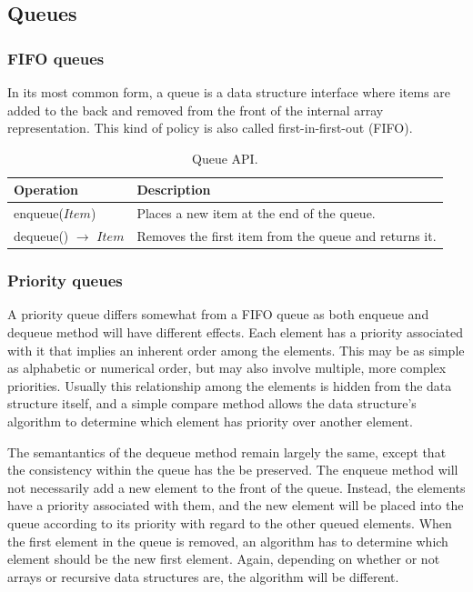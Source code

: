 \subsection{Queues}

\subsubsection{FIFO queues}

In its most common form, a queue is a data structure interface where items are added to the back and removed from the front of the internal array representation. This kind of policy is also called first-in-first-out (FIFO).

\begin{table}[H]
	\caption{Queue API.}
	\label{tab:api:queue}
	\begin{tabular}{p{150px} | p{250px}}
		\textbf{Operation} & \textbf{Description} \\
		\hline
		enqueue($Item$) & Places a new item at the end of the queue. \\
		dequeue() $\rightarrow$ $Item$ & Removes the first item from the queue and returns it. \\
		\hline
	\end{tabular}
\end{table}



\subsubsection{Priority queues}

A priority queue differs somewhat from a FIFO queue as both enqueue and dequeue method will have different effects. Each element has a priority associated with it that implies an inherent order among the elements. This may be as simple as alphabetic or numerical order, but may also involve multiple, more complex priorities. Usually this relationship among the elements is hidden from the data structure itself, and a simple compare method allows the data structure's algorithm to determine which element has priority over another element.

The semantantics of the dequeue method remain largely the same, except that the consistency within the queue has the be preserved. The enqueue method will not necessarily add a new element to the front of the queue. Instead, the elements have a priority associated with them, and the new element will be placed into the queue according to its priority with regard to the other queued elements. When the first element in the queue is removed, an algorithm has to determine which element should be the new first element. Again, depending on whether or not arrays or recursive data structures are, the algorithm will be different.



